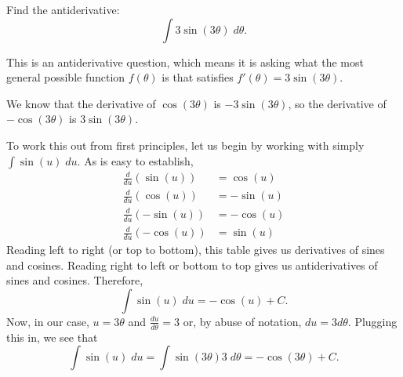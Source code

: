 \documentclass{ximera}
\author{Emma Smith Zbarsky}
\begin{document}
\begin{exercise}

Find the antiderivative: \[\int 3\sin(3\theta)\; d\theta.\]


\begin{hint}
This is an antiderivative question, which means it is asking what the
most general possible function $f(\theta)$ is that satisfies
$f'(\theta) = 3\sin(3\theta)$.
\end{hint}


\begin{hint}
We know that the derivative of $\cos(3\theta)$ is $-3\sin(3\theta)$, so
the derivative of $-\cos(3\theta)$ is $3\sin(3\theta)$.

To work this out from first principles, let us begin by working with
simply $\int \sin(u)\; du$. As is easy to establish, \begin{align*}
\frac{d}{du}\left(\sin(u)\right) &= \cos(u) \\
\frac{d}{du}\left(\cos(u)\right) &= -\sin(u) \\
\frac{d}{du}\left(-\sin(u)\right) &= -\cos(u) \\
\frac{d}{du}\left(-\cos(u)\right) &= \sin(u) 
\end{align*} Reading left to right (or top to bottom), this table
gives us derivatives of sines and cosines. Reading right to left or
bottom to top gives us antiderivatives of sines and cosines. Therefore,
\[\int \sin(u)\; du = -\cos(u)+C.\] Now, in our case, $u = 3\theta$ and
$\frac{du}{d\theta} = 3$ or, by abuse of notation, $du = 3d\theta$.
Plugging this in, we see that
\[\int \sin(u)\; du = \int \sin(3\theta) 3\; d\theta = -\cos(3\theta)+C.\]
\end{hint}


\begin{multipleChoice}
\end{multipleChoice}

\end{exercise}
\end{document}

